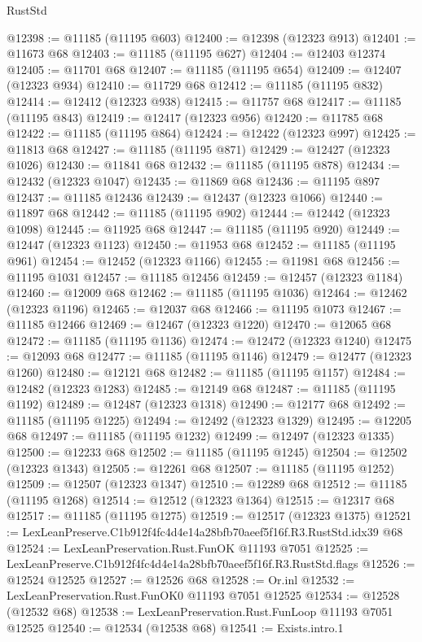 \begin{lexlean}{RustStd}
\begin{coremodule}
@12398 := @11185 (@11195 @603)
@12400 := @12398 (@12323 @913)
@12401 := @11673 @68
@12403 := @11185 (@11195 @627)
@12404 := @12403 @12374
@12405 := @11701 @68
@12407 := @11185 (@11195 @654)
@12409 := @12407 (@12323 @934)
@12410 := @11729 @68
@12412 := @11185 (@11195 @832)
@12414 := @12412 (@12323 @938)
@12415 := @11757 @68
@12417 := @11185 (@11195 @843)
@12419 := @12417 (@12323 @956)
@12420 := @11785 @68
@12422 := @11185 (@11195 @864)
@12424 := @12422 (@12323 @997)
@12425 := @11813 @68
@12427 := @11185 (@11195 @871)
@12429 := @12427 (@12323 @1026)
@12430 := @11841 @68
@12432 := @11185 (@11195 @878)
@12434 := @12432 (@12323 @1047)
@12435 := @11869 @68
@12436 := @11195 @897
@12437 := @11185 @12436
@12439 := @12437 (@12323 @1066)
@12440 := @11897 @68
@12442 := @11185 (@11195 @902)
@12444 := @12442 (@12323 @1098)
@12445 := @11925 @68
@12447 := @11185 (@11195 @920)
@12449 := @12447 (@12323 @1123)
@12450 := @11953 @68
@12452 := @11185 (@11195 @961)
@12454 := @12452 (@12323 @1166)
@12455 := @11981 @68
@12456 := @11195 @1031
@12457 := @11185 @12456
@12459 := @12457 (@12323 @1184)
@12460 := @12009 @68
@12462 := @11185 (@11195 @1036)
@12464 := @12462 (@12323 @1196)
@12465 := @12037 @68
@12466 := @11195 @1073
@12467 := @11185 @12466
@12469 := @12467 (@12323 @1220)
@12470 := @12065 @68
@12472 := @11185 (@11195 @1136)
@12474 := @12472 (@12323 @1240)
@12475 := @12093 @68
@12477 := @11185 (@11195 @1146)
@12479 := @12477 (@12323 @1260)
@12480 := @12121 @68
@12482 := @11185 (@11195 @1157)
@12484 := @12482 (@12323 @1283)
@12485 := @12149 @68
@12487 := @11185 (@11195 @1192)
@12489 := @12487 (@12323 @1318)
@12490 := @12177 @68
@12492 := @11185 (@11195 @1225)
@12494 := @12492 (@12323 @1329)
@12495 := @12205 @68
@12497 := @11185 (@11195 @1232)
@12499 := @12497 (@12323 @1335)
@12500 := @12233 @68
@12502 := @11185 (@11195 @1245)
@12504 := @12502 (@12323 @1343)
@12505 := @12261 @68
@12507 := @11185 (@11195 @1252)
@12509 := @12507 (@12323 @1347)
@12510 := @12289 @68
@12512 := @11185 (@11195 @1268)
@12514 := @12512 (@12323 @1364)
@12515 := @12317 @68
@12517 := @11185 (@11195 @1275)
@12519 := @12517 (@12323 @1375)
@12521 := LexLeanPreserve.C1b912f4fc4d4e14a28bfb70aeef5f16f.R3.RustStd.idx39 @68
@12524 := LexLeanPreservation.Rust.FunOK @11193 @7051
@12525 := LexLeanPreserve.C1b912f4fc4d4e14a28bfb70aeef5f16f.R3.RustStd.flags
@12526 := @12524 @12525
@12527 := @12526 @68
@12528 := Or.inl
@12532 := LexLeanPreservation.Rust.FunOK0 @11193 @7051 @12525
@12534 := @12528 (@12532 @68)
@12538 := LexLeanPreservation.Rust.FunLoop @11193 @7051 @12525
@12540 := @12534 (@12538 @68)
@12541 := Exists.intro.{1}

\end{coremodule}
\end{lexlean}
